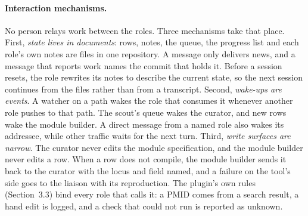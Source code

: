 \documentclass[11pt,a4paper]{article}
\begin{document}
\paragraph{Interaction mechanisms.} No person relays work between the roles.
Three mechanisms take that place. First, \emph{state lives in documents}:
rows, notes, the queue, the progress list and each role's own notes are files
in one repository. A message only delivers news, and a message that reports
work names the commit that holds it. Before a session resets, the role
rewrites its notes to describe the current state, so the next session
continues from the files rather than from a transcript. Second, \emph{wake-ups
are events}. A watcher on a path wakes the role that consumes it whenever
another role pushes to that path. The scout's queue wakes the curator, and new
rows wake the module builder. A direct message from a named role also wakes
its addressee, while other traffic waits for the next turn. Third, \emph{write
surfaces are narrow}. The curator never edits the module specification, and
the module builder never edits a row. When a row does not compile, the module
builder sends it back to the curator with the locus and field named, and a
failure on the tool's side goes to the liaison with its reproduction. The
plugin's own rules (Section~3.3) bind every role that calls it: a PMID comes
from a search result, a hand edit is logged, and a check that could not run is
reported as unknown.
\end{document}
